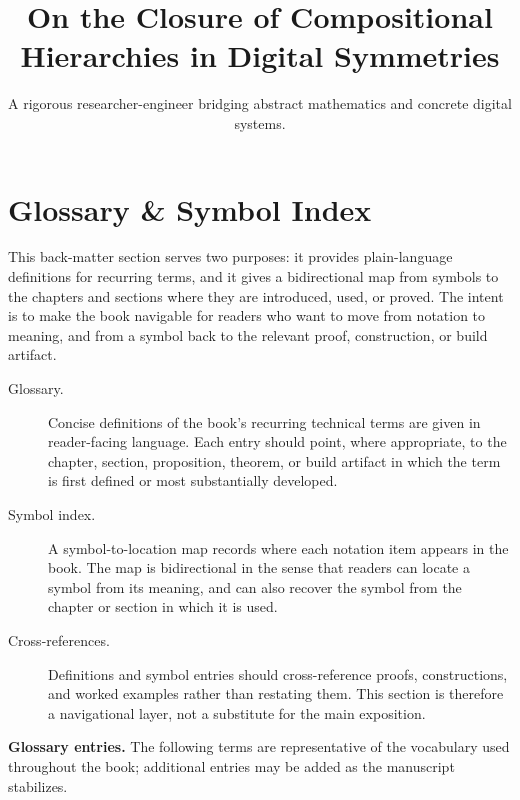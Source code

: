\documentclass[11pt]{article}
\title{On the Closure of Compositional Hierarchies in Digital Symmetries}
\author{A rigorous researcher-engineer bridging abstract mathematics and concrete digital systems.}
\begin{document}
\section*{Glossary \& Symbol Index}

This back-matter section serves two purposes: it provides plain-language definitions for recurring terms, and it gives a bidirectional map from symbols to the chapters and sections where they are introduced, used, or proved. The intent is to make the book navigable for readers who want to move from notation to meaning, and from a symbol back to the relevant proof, construction, or build artifact.

\begin{description}
  \item[Glossary.] Concise definitions of the book's recurring technical terms are given in reader-facing language. Each entry should point, where appropriate, to the chapter, section, proposition, theorem, or build artifact in which the term is first defined or most substantially developed.
  \item[Symbol index.] A symbol-to-location map records where each notation item appears in the book. The map is bidirectional in the sense that readers can locate a symbol from its meaning, and can also recover the symbol from the chapter or section in which it is used.
  \item[Cross-references.] Definitions and symbol entries should cross-reference proofs, constructions, and worked examples rather than restating them. This section is therefore a navigational layer, not a substitute for the main exposition.
\end{description}

\medskip

\noindent\textbf{Glossary entries.} The following terms are representative of the vocabulary used throughout the book; additional entries may be added as the manuscript stabilizes.
\end{document}
